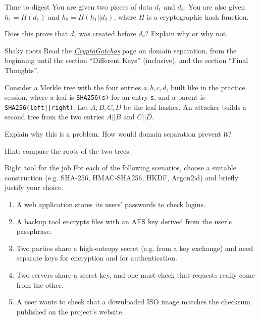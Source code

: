 \documentclass{homework}
\begin{document}
\begin{task}{Time to digest}
  You are given two pieces of data $d_1$ and $d_2$.
  You are also given $h_1 = H(d_1)$ and $h_2 = H(h_1||d_2)$, where $H$ is a cryptographic hash function.

  Does this prove that $d_1$ was created before $d_2$?
  Explain why or why not.
\end{task}

\begin{task}{Shaky roots}
  Read the \href{https://gotchas.salusa.dev/domain_separation.html}{\textit{CryptoGotchas}} page on domain separation, from the beginning until the section \enquote{Different Keys} (inclusive), and the section \enquote{Final Thoughts}.

  Consider a Merkle tree with the four entries $a, b, c, d$, built like in the practice session, where a leaf is \texttt{SHA256(s)} for an entry \texttt{s}, and a parent is \texttt{SHA256(left||right)}.
  Let $A, B, C, D$ be the leaf hashes.
  An attacker builds a second tree from the two entries $A||B$ and $C||D$.

  Explain why this is a problem.
  How would domain separation prevent it?

  {\scriptsize Hint: compare the roots of the two trees.}
\end{task}

\begin{task}{Right tool for the job}
  For each of the following scenarios, choose a suitable construction (e.g. SHA-256, HMAC-SHA256, HKDF, Argon2id) and briefly justify your choice.
  \begin{enumerate}
    \item A web application stores its users' passwords to check logins.
    \item A backup tool encrypts files with an AES key derived from the user's passphrase.
    \item Two parties share a high-entropy secret (e.g. from a key exchange) and need separate keys for encryption and for authentication.
    \item Two servers share a secret key, and one must check that requests really come from the other.
    \item A user wants to check that a downloaded ISO image matches the checksum published on the project's website.
  \end{enumerate}
\end{task}

\newpage
\setcounter{task}{0}
\end{document}
